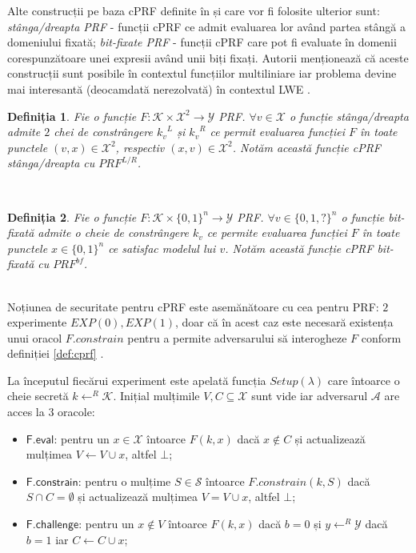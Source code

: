 \documentclass[oneside, 12pt]{book}
\newtheorem{definitie}{\textbf{Definiția}}[section]
\begin{document}
Alte construcții pe baza cPRF definite în \cite{boneh:2013constrained} și care vor fi folosite ulterior sunt: \textit{stânga/dreapta PRF} - funcții cPRF ce admit evaluarea lor având partea stângă a domeniului fixată; \textit{bit-fixate PRF} - funcții cPRF care pot fi evaluate în domenii corespunzătoare unei expresii având unii biți fixați. Autorii \cite{boneh:2013constrained} menționează că aceste construcții sunt posibile în contextul funcțiilor multiliniare iar problema devine mai interesantă (deocamdată nerezolvată) în contextul LWE \cite{regev2009lattices}. 
\\
\begin{definitie}
	Fie o funcție $F: \mathcal{K} \times \mathcal{X}^2 \rightarrow \mathcal{Y}$ PRF. $\forall v \in \mathcal{X}$ o funcție stânga/dreapta admite $2$ chei de constrângere ${k_v}^L$ și ${k_v}^R$ ce permit evaluarea funcției $F$ în toate punctele $(v, x) \in \mathcal{X}^2$, respectiv $(x, v) \in \mathcal{X}^2$. Notăm această funcție cPRF stânga/dreapta cu $PRF^{L/R}$.
\end{definitie}
\mbox{}\\
\begin{definitie}
	Fie o funcție $F: \mathcal{K} \times {\{0, 1\}}^n \rightarrow \mathcal{Y}$ PRF. $\forall v \in {\{0, 1, ? \}}^n$ o funcție bit-fixată admite o cheie de constrângere $k_v$ ce permite evaluarea funcției $F$ în toate punctele $x \in \{0,1\}^n$ ce satisfac modelul lui $v$.
	Notăm această funcție cPRF bit-fixată cu $PRF^{bf}$.
\end{definitie}
\mbox{}\\
Noțiunea de securitate pentru cPRF  este asemănătoare cu cea pentru PRF: $2$ experimente $EXP(0), EXP(1)$, doar că în acest caz este necesară existența unui oracol $F.constrain$ pentru a permite adversarului să interogheze $F$ conform definiției \ref{def:cprf} \cite{boneh:2013constrained}.

La începutul fiecărui experiment este apelată funcția $Setup(\lambda)$ care întoarce o cheie secretă $k \leftarrow^R \mathcal{K}$. Inițial mulțimile $V, C \subseteq \mathcal{X}$ sunt vide iar adversarul $\mathcal{A}$ are acces la $3$ oracole:
\begin{itemize}
	\item $\mathsf{F.eval}$: pentru un $x \in \mathcal{X}$ întoarce $F(k, x)$ dacă $x \not \in C$ și actualizează mulțimea $V \leftarrow V \cup x$, altfel $\bot$;
	\item $\mathsf{F.constrain}$: pentru o mulțime $S \in \mathcal{S}$ întoarce $F.constrain(k, S)$ dacă $S \cap C = \emptyset$ și actualizează mulțimea $V = V \cup x$, altfel $\bot$;
	\item $\mathsf{F.challenge}$: pentru un $x \not \in V$ întoarce $F(k, x)$ dacă $b = 0$ și $y \leftarrow^R \mathcal{Y}$ dacă $b = 1$ iar $C \leftarrow C \cup x$;
\end{itemize}
\end{document}
